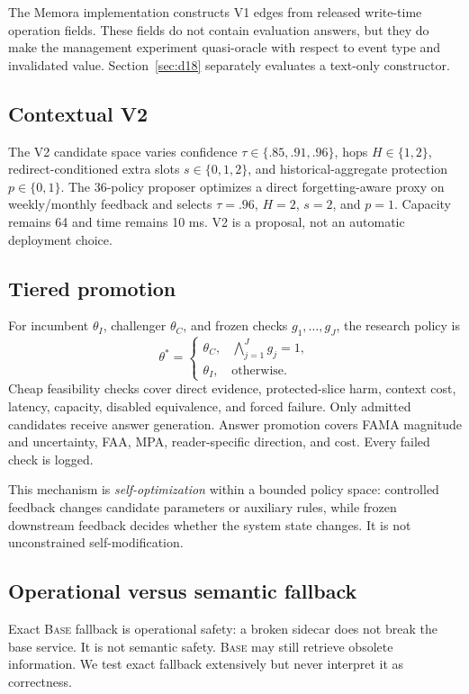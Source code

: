 \documentclass[10pt]{article}
\newcommand{\base}{\textsc{Base}\xspace}
\newcommand{\vtwo}{\textsc{V2}\xspace}
\begin{document}
The Memora implementation constructs V1 edges from released write-time operation fields. These fields do not contain evaluation answers, but they do make the management experiment quasi-oracle with respect to event type and invalidated value. Section~\ref{sec:d18} separately evaluates a text-only constructor.

\subsection{Contextual V2}

The \vtwo candidate space varies confidence $\tau\in\{.85,.91,.96\}$, hops $H\in\{1,2\}$, redirect-conditioned extra slots $s\in\{0,1,2\}$, and historical-aggregate protection $p\in\{0,1\}$. The 36-policy proposer optimizes a direct forgetting-aware proxy on weekly/monthly feedback and selects $\tau=.96$, $H=2$, $s=2$, and $p=1$. Capacity remains 64 and time remains 10 ms. \vtwo is a proposal, not an automatic deployment choice.

\subsection{Tiered promotion}

For incumbent $\theta_I$, challenger $\theta_C$, and frozen checks $g_1,\ldots,g_J$, the research policy is
\[
\theta^*=\begin{cases}
\theta_C,&\bigwedge_{j=1}^{J}g_j=1,\\
\theta_I,&\text{otherwise.}
\end{cases}
\]
Cheap feasibility checks cover direct evidence, protected-slice harm, context cost, latency, capacity, disabled equivalence, and forced failure. Only admitted candidates receive answer generation. Answer promotion covers FAMA magnitude and uncertainty, FAA, MPA, reader-specific direction, and cost. Every failed check is logged.

This mechanism is \emph{self-optimization} within a bounded policy space: controlled feedback changes candidate parameters or auxiliary rules, while frozen downstream feedback decides whether the system state changes. It is not unconstrained self-modification.

\subsection{Operational versus semantic fallback}

Exact \base fallback is operational safety: a broken sidecar does not break the base service. It is not semantic safety. \base may still retrieve obsolete information. We test exact fallback extensively but never interpret it as correctness.
\end{document}
